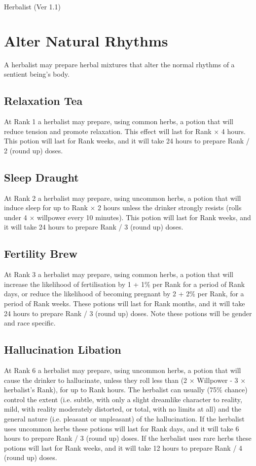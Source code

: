 \begin{Chapter}{Herbalist (Ver 1.1)}
\section{Alter Natural Rhythms}

A herbalist may prepare herbal mixtures that alter the normal rhythms
of a sentient being’s body.

\subsection{Relaxation Tea}

At Rank 1 a herbalist may prepare, using common herbs, a potion that
will reduce tension and promote relaxation.  This effect will last for
Rank × 4 hours.  This potion will last for Rank weeks, and it will take
24 hours to prepare Rank / 2 (round up) doses.

\subsection{Sleep Draught}

At Rank 2 a herbalist may prepare, using uncommon herbs, a potion that
will induce sleep for up to Rank × 2 hours unless the drinker strongly
resists (rolls under 4 × willpower every 10 minutes).  This potion
will last for Rank weeks, and it will take 24 hours to prepare Rank /
3 (round up) doses.

\subsection{Fertility Brew}

At Rank 3 a herbalist may prepare, using common herbs, a potion that
will increase the likelihood of fertilisation by 1 + 1\% per Rank for
a period of Rank days, or reduce the likelihood of becoming pregnant
by 2 + 2\% per Rank, for a period of Rank weeks.  These potions will
last for Rank months, and it will take 24 hours to prepare Rank / 3
(round up) doses.  Note these potions will be gender and race
specific.

\subsection{Hallucination Libation}

At Rank 6 a herbalist may prepare, using uncommon herbs, a potion that
will cause the drinker to hallucinate, unless they roll less than (2 ×
Willpower - 3 × herbalist’s Rank), for up to Rank hours.  The
herbalist can usually (75\% chance) control the extent (i.e. subtle,
with only a slight dreamlike character to reality, mild, with reality
moderately distorted, or total, with no limits at all) and the general
nature (i.e. pleasant or unpleasant) of the hallucination.  If the
herbalist uses uncommon herbs these potions will last for Rank days,
and it will take 6 hours to prepare Rank / 3 (round up) doses.  If the
herbalist uses rare herbs these potions will last for Rank weeks, and
it will take 12 hours to prepare Rank / 4 (round up) doses.


\end{Chapter}
